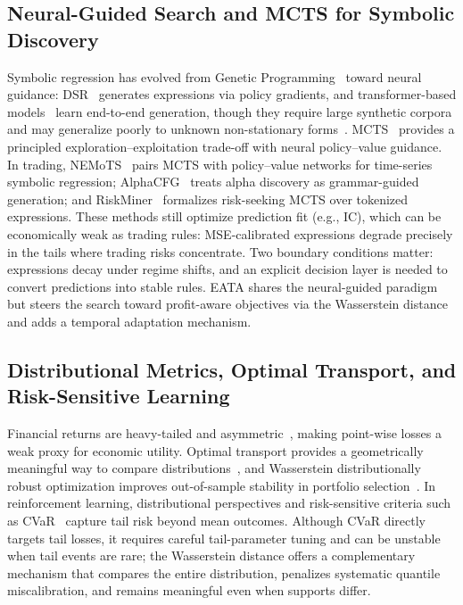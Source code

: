 \subsection{Neural-Guided Search and MCTS for Symbolic Discovery}

Symbolic regression has evolved from Genetic Programming~\cite{koza1994genetic} toward neural guidance: DSR~\cite{petersen2021deep} generates expressions via policy gradients, and transformer-based models~\cite{biggio2021neural,kamienny2022end} learn end-to-end generation, though they require large synthetic corpora and may generalize poorly to unknown non-stationary forms~\cite{makke2024interpretable}. MCTS~\cite{coulom2006efficient} provides a principled exploration--exploitation trade-off with neural policy--value guidance. In trading, NEMoTS~\cite{xie2024nemots} pairs MCTS with policy--value networks for time-series symbolic regression; AlphaCFG~\cite{yang2026alpha} treats alpha discovery as grammar-guided generation; and RiskMiner~\cite{ren2024riskminer} formalizes risk-seeking MCTS over tokenized expressions. These methods still optimize prediction fit (e.g., IC), which can be economically weak as trading rules: MSE-calibrated expressions degrade precisely in the tails where trading risks concentrate. Two boundary conditions matter: expressions decay under regime shifts, and an explicit decision layer is needed to convert predictions into stable rules. EATA shares the neural-guided paradigm but steers the search toward profit-aware objectives via the Wasserstein distance and adds a temporal adaptation mechanism.

\subsection{Distributional Metrics, Optimal Transport, and Risk-Sensitive Learning}

Financial returns are heavy-tailed and asymmetric~\cite{cont2001empirical}, making point-wise losses a weak proxy for economic utility. Optimal transport provides a geometrically meaningful way to compare distributions~\cite{villani2009optimal}, and Wasserstein distributionally robust optimization improves out-of-sample stability in portfolio selection~\cite{pesenti2023pOrtfolio}. In reinforcement learning, distributional perspectives and risk-sensitive criteria such as CVaR~\cite{chow2015cvar} capture tail risk beyond mean outcomes. Although CVaR directly targets tail losses, it requires careful tail-parameter tuning and can be unstable when tail events are rare; the Wasserstein distance offers a complementary mechanism that compares the entire distribution, penalizes systematic quantile miscalibration, and remains meaningful even when supports differ.

